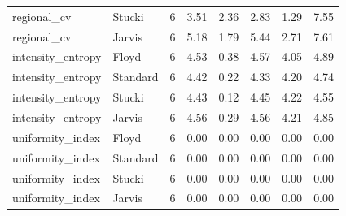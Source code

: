 \begin{tabular}{llrlllll}
regional_cv & Stucki & 6 & 3.51 & 2.36 & 2.83 & 1.29 & 7.55 \\
regional_cv & Jarvis & 6 & 5.18 & 1.79 & 5.44 & 2.71 & 7.61 \\
intensity_entropy & Floyd & 6 & 4.53 & 0.38 & 4.57 & 4.05 & 4.89 \\
intensity_entropy & Standard & 6 & 4.42 & 0.22 & 4.33 & 4.20 & 4.74 \\
intensity_entropy & Stucki & 6 & 4.43 & 0.12 & 4.45 & 4.22 & 4.55 \\
intensity_entropy & Jarvis & 6 & 4.56 & 0.29 & 4.56 & 4.21 & 4.85 \\
uniformity_index & Floyd & 6 & 0.00 & 0.00 & 0.00 & 0.00 & 0.00 \\
uniformity_index & Standard & 6 & 0.00 & 0.00 & 0.00 & 0.00 & 0.00 \\
uniformity_index & Stucki & 6 & 0.00 & 0.00 & 0.00 & 0.00 & 0.00 \\
uniformity_index & Jarvis & 6 & 0.00 & 0.00 & 0.00 & 0.00 & 0.00 \\
\bottomrule
\end{tabular}
